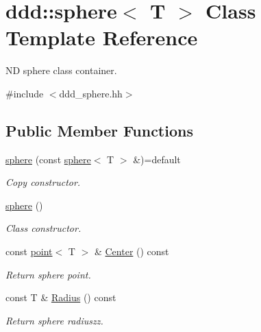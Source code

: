 \hypertarget{classddd_1_1sphere}{}\section{ddd\+:\+:sphere$<$ T $>$ Class Template Reference}
\label{classddd_1_1sphere}


ND sphere class container.  




{\ttfamily \#include $<$ddd\+\_\+sphere.\+hh$>$}

\subsection*{Public Member Functions}
\begin{DoxyCompactItemize}
\item 
\mbox{\label{classddd_1_1sphere_ac434fad67b03cf195558e2b2185e6b42}} 
\hyperlink{classddd_1_1sphere_ac434fad67b03cf195558e2b2185e6b42}{sphere} (const \hyperlink{classddd_1_1sphere}{sphere}$<$ T $>$ \&)=default
\begin{DoxyCompactList}\small\item\em Copy constructor. \end{DoxyCompactList}\item 
\mbox{\label{classddd_1_1sphere_aedcf4e205c6f6ce5f23ab63de4dbb0ac}} 
\hyperlink{classddd_1_1sphere_aedcf4e205c6f6ce5f23ab63de4dbb0ac}{sphere} ()
\begin{DoxyCompactList}\small\item\em Class constructor. \end{DoxyCompactList}\item 
\mbox{\label{classddd_1_1sphere_ae6804085242cdbdc51633b2507944e31}} 
const \hyperlink{classddd_1_1point}{point}$<$ T $>$ \& \hyperlink{classddd_1_1sphere_ae6804085242cdbdc51633b2507944e31}{Center} () const
\begin{DoxyCompactList}\small\item\em Return sphere point. \end{DoxyCompactList}\item 
\mbox{\label{classddd_1_1sphere_a739abf2e15cd66120dbe306153c35caa}} 
const T \& \hyperlink{classddd_1_1sphere_a739abf2e15cd66120dbe306153c35caa}{Radius} () const
\begin{DoxyCompactList}\small\item\em Return sphere radiuszz. \end{DoxyCompactList}\end{DoxyCompactItemize}


